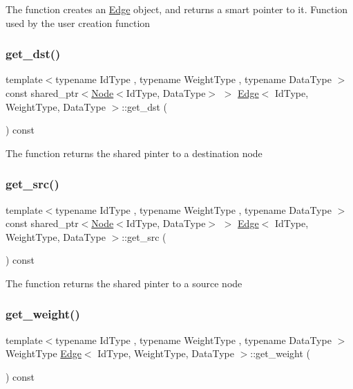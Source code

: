 The function creates an \hyperlink{class_edge}{Edge} object, and returns a smart pointer to it. Function used by the user creation function \mbox{\label{class_edge_aeb09ab0156b04b4de3fc5cc100e39c82}} 
\subsubsection{\texorpdfstring{get\+\_\+dst()}{get\_dst()}}
{\footnotesize\ttfamily template$<$typename Id\+Type , typename Weight\+Type , typename Data\+Type $>$ \\
const shared\+\_\+ptr$<$\hyperlink{class_node}{Node}$<$Id\+Type, Data\+Type$>$ $>$ \hyperlink{class_edge}{Edge}$<$ Id\+Type, Weight\+Type, Data\+Type $>$\+::get\+\_\+dst (\begin{DoxyParamCaption}{ }\end{DoxyParamCaption}) const\hspace{0.3cm}{\ttfamily [inline]}}

The function returns the shared pinter to a destination node \mbox{\label{class_edge_a4deca3bdaa548c96f9677fbae2bd3f4f}} 
\subsubsection{\texorpdfstring{get\+\_\+src()}{get\_src()}}
{\footnotesize\ttfamily template$<$typename Id\+Type , typename Weight\+Type , typename Data\+Type $>$ \\
const shared\+\_\+ptr$<$\hyperlink{class_node}{Node}$<$Id\+Type, Data\+Type$>$ $>$ \hyperlink{class_edge}{Edge}$<$ Id\+Type, Weight\+Type, Data\+Type $>$\+::get\+\_\+src (\begin{DoxyParamCaption}{ }\end{DoxyParamCaption}) const\hspace{0.3cm}{\ttfamily [inline]}}

The function returns the shared pinter to a source node \mbox{\label{class_edge_a9974565bdcddde77cf1935556170a485}} 
\subsubsection{\texorpdfstring{get\+\_\+weight()}{get\_weight()}}
{\footnotesize\ttfamily template$<$typename Id\+Type , typename Weight\+Type , typename Data\+Type $>$ \\
Weight\+Type \hyperlink{class_edge}{Edge}$<$ Id\+Type, Weight\+Type, Data\+Type $>$\+::get\+\_\+weight (\begin{DoxyParamCaption}{ }\end{DoxyParamCaption}) const\hspace{0.3cm}{\ttfamily [inline]}}

